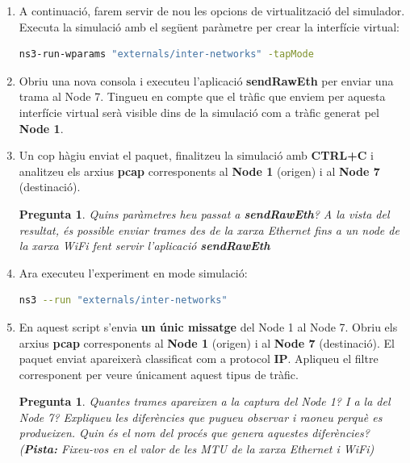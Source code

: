 \documentclass[12pt,a4paper]{article}
\newcounter{exercises}
\newtheorem{exer}[exercises]{Pregunta}
\begin{document}
\begin{enumerate}
\item A continuació, farem servir de nou les opcions de virtualització del simulador. Executa la simulació amb el següent paràmetre per crear la interfície virtual:
\begin{lstlisting}[language=bash]
ns3-run-wparams "externals/inter-networks" -tapMode
\end{lstlisting}
\item Obriu una nova consola i executeu l'aplicació \textbf{sendRawEth} per enviar una trama al Node 7. Tingueu en compte que el tràfic que enviem per aquesta interfície virtual serà visible dins de la simulació com a tràfic generat pel \textbf{Node 1}.

\item Un cop hàgiu enviat el paquet, finalitzeu la simulació amb \textbf{CTRL+C} i analitzeu els arxius \textbf{pcap} corresponents al \textbf{Node 1} (origen) i al \textbf{Node 7} (destinació).

\begin{exer} Quins paràmetres heu passat a \textbf{sendRawEth}? A la vista del resultat, és possible enviar trames des de la xarxa Ethernet fins a un node de la xarxa WiFi fent servir l'aplicació \textbf{sendRawEth} \end{exer}

\item Ara executeu l'experiment en mode simulació:
\begin{lstlisting}[language=bash]
ns3 --run "externals/inter-networks"
\end{lstlisting}

\item En aquest script s'envia \textbf{un únic missatge} del Node 1 al Node 7. Obriu els arxius \textbf{pcap} corresponents al \textbf{Node 1} (origen) i al \textbf{Node 7} (destinació). El paquet enviat apareixerà classificat com a protocol \textbf{IP}. Apliqueu el filtre corresponent per veure únicament aquest tipus de tràfic.

\begin{exer} Quantes trames apareixen a la captura del Node 1? I a la del Node 7? Expliqueu les diferències que pugueu observar i raoneu perquè es produeixen. Quin és el nom del procés que genera aquestes diferències? (\textbf{Pista:} Fixeu-vos en el valor de les MTU de la xarxa Ethernet i WiFi) \end{exer}


\end{enumerate}
\end{document}
